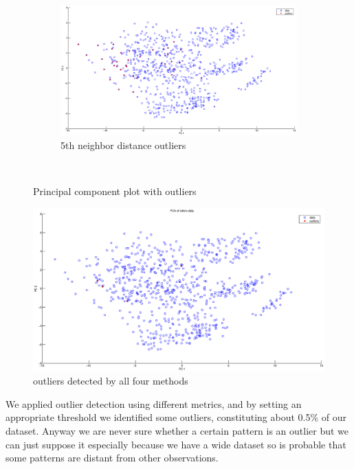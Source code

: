 \begin{figure}[htbp]
                \quad
	\begin{subfigure}[b]{0.55\textwidth}
                \includegraphics[width=10cm]{figures/pc4.eps}
                \caption{5th neighbor distance outliers}
         \end{subfigure} \\
        \caption{Principal component plot with outliers}
        \label{fig:r2}
\end{figure}

\begin{figure}[!tbh]
  \centering
  \includegraphics[width=1.0\textwidth]{figures/pc5}
  \caption{outliers detected by all four methods}
  \label{ffig:r3}
\end{figure}

We applied outlier detection using different metrics, and by setting an appropriate threshold we identified some outliers, constituting about 0.5\% of our dataset. Anyway we are never sure whether a certain pattern is an outlier but we can just suppose it especially because we have a wide dataset so is probable that some patterns are distant from other observations.
%
